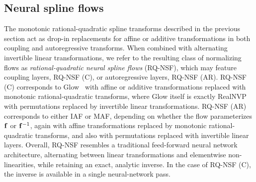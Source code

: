 \subsection{Neural spline flows}

The monotonic rational-quadratic spline transforms described in the previous section act as drop-in replacements for affine or additive transformations in both coupling and autoregressive transforms. 
When combined with alternating invertible linear transformations, we refer to the resulting class of normalizing flows as \emph{rational-quadratic neural spline flows} (RQ-NSF), which may feature coupling layers, RQ-NSF (C), or autoregressive layers, RQ-NSF (AR)\@. 
RQ-NSF (C) corresponds to Glow~\citep{Kingma:2018:glow} with affine or additive transformations replaced with monotonic rational-quadratic transforms, where Glow itself is exactly RealNVP with permutations replaced by invertible linear transformations.
RQ-NSF (AR) corresponds to either IAF or MAF, depending on whether the flow parameterizes $ \mathbf{f} $ or $ \mathbf{f}^{-1} $,
again with affine transformations replaced by monotonic rational-quadratic transforms, and also with permutations replaced with invertible linear layers.
Overall, RQ-NSF resembles a traditional feed-forward neural network architecture, alternating between linear transformations and elementwise non-linearities, while retaining an exact, analytic inverse. 
In the case of RQ-NSF (C), the inverse is available in a single neural-network pass.
